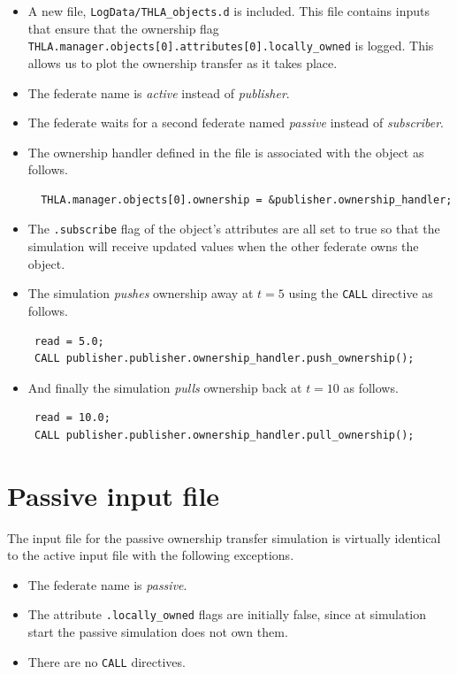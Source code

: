 \begin{itemize}
\item{
  A new file, {\tt LogData/THLA\_objects.d} is included.
  This file contains inputs that ensure that the ownership flag
  {\tt THLA.manager.objects[0].attributes[0].locally\_owned} is logged.
  This allows us to plot the ownership transfer as it takes place.
}
\item{
  The federate name is {\em active} instead of {\em publisher}.
}
\item{
  The federate waits for a second federate named {\em passive}
  instead of {\em subscriber}.
}
\item{
  The ownership handler defined in the \sdefine file is associated
  with the object as follows.
  \begin{verbatim}
  THLA.manager.objects[0].ownership = &publisher.ownership_handler; \end{verbatim}
}
\item{
  The {\tt .subscribe} flag of the object's attributes are all set to
  true so that the simulation will receive updated values when the
  other federate owns the object.
}
\item{
  The simulation {\em pushes} ownership away at $t=5$ using the {\tt CALL}
  directive as follows.
  \begin{verbatim}
 read = 5.0;
 CALL publisher.publisher.ownership_handler.push_ownership(); \end{verbatim}
}
\item{
  And finally the simulation {\em pulls} ownership back at $t=10$
  as follows.
  \begin{verbatim}
 read = 10.0;
 CALL publisher.publisher.ownership_handler.pull_ownership(); \end{verbatim}
}
\end{itemize}

\section{Passive input file}

The input file for the passive ownership transfer simulation is
virtually identical to the active input file with the following exceptions.

\begin{itemize}
\item{
  The federate name is {\em passive}.
}
\item{
  The attribute {\tt .locally\_owned} flags are initially false,
  since at simulation start the passive simulation does not own them.
}
\item{
  There are no {\tt CALL} directives.
}
\end{itemize}

